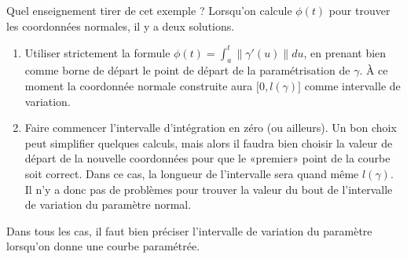 Quel enseignement tirer de cet exemple ? Lorsqu'on calcule $\phi(t)$ pour trouver les coordonnées normales, il y a deux solutions.
\begin{enumerate}
\item
    Utiliser strictement la formule $\phi(t)=\int_a^t\| \gamma'(u) \|du$, en prenant bien comme borne de départ le point de départ de la paramétrisation de $\gamma$. À ce moment la coordonnée normale construite aura $\mathopen[ 0 , l(\gamma) \mathclose]$ comme intervalle de variation.
\item
    Faire commencer l'intervalle d'intégration en zéro (ou ailleurs). Un bon choix peut simplifier quelques calculs, mais alors il faudra bien choisir la valeur de départ de la nouvelle coordonnées pour que le «premier» point de la courbe soit correct. Dans ce cas, la longueur de l'intervalle sera quand même $l(\gamma)$. Il n'y a donc pas de problèmes pour trouver la valeur du bout de l'intervalle de variation du paramètre normal.
\end{enumerate}
Dans tous les cas, il faut bien préciser l'intervalle de variation du paramètre lorsqu'on donne une courbe paramétrée.
